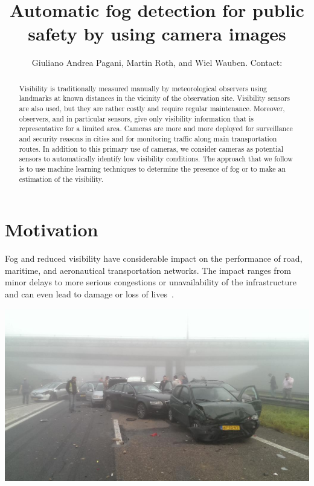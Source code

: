 \documentclass{article}
\title{Automatic fog detection for public safety by using camera images}
\author{Giuliano Andrea Pagani\affil{1}, Martin Roth\affil{1}, and Wiel Wauben\affil{1}. Contact: \email{pagani@knmi.nl}}
\begin{document}
\maketitle

\begin{abstract}
Visibility is traditionally measured manually by meteorological observers using landmarks at known distances in
the vicinity of the observation site. 
Visibility sensors are also used, but they are rather costly and
require regular maintenance. Moreover, observers, and in particular sensors, give only visibility information that is
representative for a limited area. 
Cameras are more and more deployed for surveillance and security reasons in cities and for monitoring traffic along
main transportation routes. In addition to this primary use of cameras, we consider cameras as potential sensors to
automatically identify low visibility conditions. 
The approach that we follow is to use machine learning techniques
to determine the presence of fog or to make an estimation of the visibility. 
\end{abstract}

\bcols %

\section*{Motivation}
Fog and reduced visibility have considerable impact on the performance of road, maritime, and aeronautical transportation
networks. The impact ranges from minor delays to more serious congestions or unavailability of the
infrastructure and can even lead to damage or loss of lives~\cite{gultepe2007fog}.

\begin{minipage}[b]{\columnwidth}
	\begin{center}
	\includegraphics[width=0.9\columnwidth]{Accident.jpeg}
	\label{figAccident}
	\end{center}
\end{minipage}
\vspace{-2cm}
\end{document}
